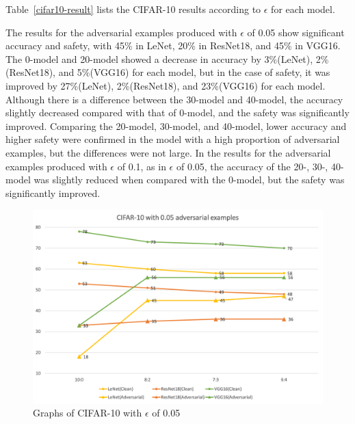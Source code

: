 \documentclass[journal,article,submit,moreauthors,pdftex]{Definitions/mdpi}
\begin{document}
Table~\ref{cifar10-result} lists the CIFAR-10 results according to \begin{math}\epsilon\end{math} for each model.

The results for the adversarial examples produced with \begin{math}\epsilon\end{math} of 0.05 show significant accuracy and safety, with 45\%  in LeNet, 20\% in ResNet18, and 45\% in VGG16.
The 0-model and 20-model showed a decrease in accuracy by 3\%(LeNet), 2\%(ResNet18), and 5\%(VGG16) for each model, but in the case of safety, it was improved by 27\%(LeNet), 2\%(ResNet18), and 23\%(VGG16) for each model.
Although there is a difference between the 30-model and 40-model, the accuracy slightly decreased compared with that of 0-model, and the safety was significantly improved.
Comparing the 20-model, 30-model, and 40-model, lower accuracy and higher safety were confirmed in the model with a high proportion of adversarial examples, but the differences were not large.
In the results for the adversarial examples produced with \begin{math}\epsilon\end{math} of 0.1, as in \begin{math}\epsilon\end{math} of 0.05, the accuracy of the 20-, 30-, 40-model was slightly reduced when compared with the 0-model, but the safety was significantly improved.

\begin{figure}[H]
    \includegraphics[width=13 cm]{Definitions/graph-005cifar10.png}
    \caption{Graphs of CIFAR-10 with \begin{math}\epsilon\end{math} of 0.05\label{cifar10-0.05-graph}}
\end{figure}
\end{document}
